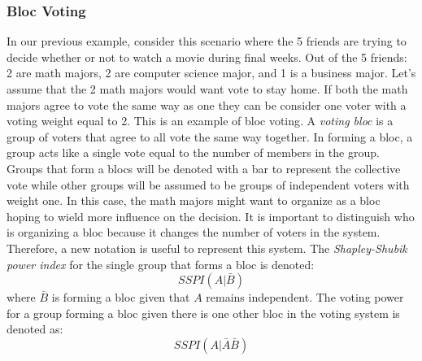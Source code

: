 \documentclass[12pt]{article}
\begin{document}
\subsubsection{Bloc Voting}
In our previous example, consider this scenario where the 5 friends are trying to decide whether or not to watch a movie during final weeks. Out of the 5 friends: 2 are math majors, 2 are computer science major, and 1 is a business major. Let's assume that the 2 math majors would want vote to stay home. If both the math majors agree to vote the same way as one they can be consider one voter with a voting weight equal to 2. This is an example of bloc voting. A \textit{voting bloc} is a group of voters that agree to all vote the same way together. In forming a bloc, a group acts like a single vote equal to the number of members in the group.
Groups that form a blocs will be denoted with a bar to represent the collective vote while other groups will be assumed to be groups of independent voters with weight one. In this case, the math majors might want to organize as a bloc hoping to wield more influence on the decision. It is important to distinguish who is organizing a bloc because it changes the number of voters in the system. Therefore, a new notation is useful to represent this system.
The \textit{Shapley-Shubik power index} for the single group that forms a bloc is denoted:
\begin{equation}
SSPI(A|\bar{B})
\end{equation}
where $\bar{B}$ is forming a bloc given that $A$ remains independent.
The voting power for a group forming a bloc given there is one other bloc in the voting system is denoted as:\begin{equation}
SSPI(A|\bar{A}\bar{B})
\end{equation}
\end{document}
